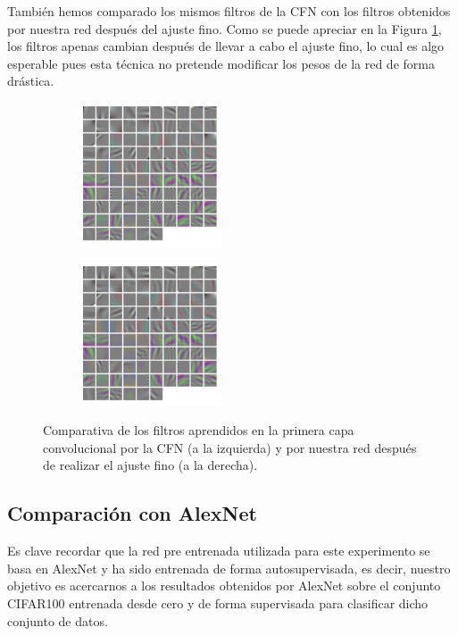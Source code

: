 \documentclass[10pt,a4paper]{article}
\begin{document}
También hemos comparado los mismos filtros de la CFN con los filtros obtenidos por nuestra red después del ajuste fino. Como se puede apreciar en la Figura \ref{fig:filtros_cfn_vs_sc_ft}, los filtros apenas cambian después de llevar a cabo el ajuste fino, lo cual es algo esperable pues esta técnica no pretende modificar los pesos de la red de forma drástica.

\begin{figure}[h]
	\begin{subfigure}{0.5\textwidth}
		\centering
		\includegraphics[height=160px,width=160px]{filtros_conv1_sc}
	\end{subfigure}
	\begin{subfigure}{0.5\textwidth}
		\centering
		\includegraphics[height=160px,width=160px]{filtros_conv1_sc_ft}
	\end{subfigure}
	\caption{Comparativa de los filtros aprendidos en la primera capa convolucional por la CFN (a la izquierda) y por nuestra red después de realizar el ajuste fino (a la derecha).}
	\label{fig:filtros_cfn_vs_sc_ft}
\end{figure}



\subsection{Comparación con AlexNet}

Es clave recordar que la red pre entrenada utilizada para este experimento se basa en AlexNet y ha sido entrenada de forma autosupervisada, es decir, nuestro objetivo es acercarnos a los resultados obtenidos por AlexNet sobre el conjunto CIFAR100 entrenada desde cero y de forma supervisada para clasificar dicho conjunto de datos. 
\end{document}
